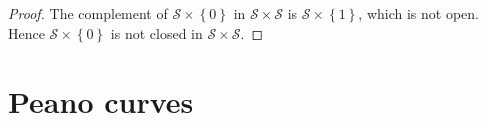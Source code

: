 \begin{proof}
	The complement of \( \mathscr{S} \times \left\{0\right\} \) in \( \mathscr{S} \times \mathscr{S} \) is \( \mathscr{S} \times \left\{1\right\} \), which is not open. Hence \( \mathscr{S} \times \left\{ 0 \right\} \) is not closed in \( \mathscr{S} \times \mathscr{S} \).
\end{proof}

\section{Peano curves}

